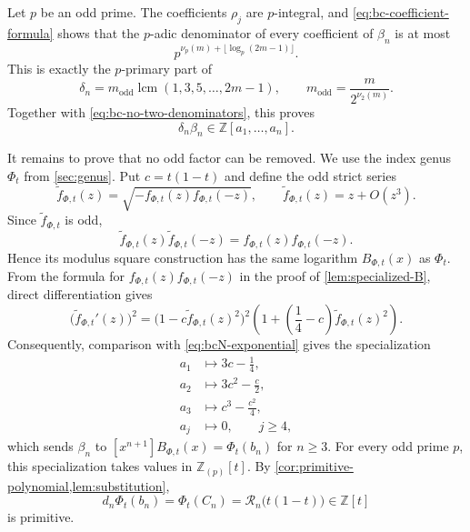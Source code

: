 \documentclass[14pt,dvipsnames]{extarticle}
\makeatletter
\numberwithin{equation}{subsection}
\theoremstyle{plain}
\theoremstyle{definition}
\theoremstyle{definition}
\renewenvironment{proof}[1][\proofname]{
 \par\pushQED{\qed}\normalfont
 \topsep6\p@\@plus6\p@\relax
 \trivlist\item[\hskip\labelsep\bfseries\itshape #1\@addpunct{.}]
}{\popQED\endtrivlist\@endpefalse}
\DeclareMathOperator{\lcm}{lcm}
\makeatother
\begin{document}
\begin{proof}[Proof of \cref{thm:bc-odd-denominator}]
Let $p$ be an odd prime. The coefficients $\rho_j$ are $p$-integral, and
\eqref{eq:bc-coefficient-formula} shows that the $p$-adic denominator of every
coefficient of $\beta_n$ is at most
\[
 p^{\nu_p(m)+\lfloor\log_p(2m-1)\rfloor}.
\]
This is exactly the $p$-primary part of
\[
 \delta_n=m_{\mathrm{odd}}\lcm(1,3,5,\ldots,2m-1),
 \qquad
 m_{\mathrm{odd}}=\frac{m}{2^{\nu_2(m)}}.
\]
Together with \eqref{eq:bc-no-two-denominators}, this proves
\begin{equation}\label{eq:bc-upper-odd}
 \delta_n\beta_n\in\mathbb Z[a_1,\ldots,a_n].
\end{equation}

It remains to prove that no odd factor can be removed. We use the index
genus $\Phi_t$ from \cref{sec:genus}. Put $c=t(1-t)$ and define the odd
strict series
\begin{equation}\label{eq:oddification-Phi}
 \widetilde f_{\Phi,t}(z)
 =\sqrt{-f_{\Phi,t}(z)f_{\Phi,t}(-z)},
 \qquad
 \widetilde f_{\Phi,t}(z)=z+O(z^3).
\end{equation}
Since $\widetilde f_{\Phi,t}$ is odd,
\[
 \widetilde f_{\Phi,t}(z)\widetilde f_{\Phi,t}(-z)
 =f_{\Phi,t}(z)f_{\Phi,t}(-z).
\]
Hence its modulus square construction has the same logarithm
$B_{\Phi,t}(x)$ as $\Phi_t$. From the formula for
$f_{\Phi,t}(z)f_{\Phi,t}(-z)$ in the proof of \cref{lem:specialized-B},
direct differentiation gives
\begin{equation}\label{eq:oddification-equation}
 \bigl(\widetilde f_{\Phi,t}'(z)\bigr)^2
 =\bigl(1-c\widetilde f_{\Phi,t}(z)^2\bigr)^2
  \left(1+\left(\frac14-c\right)\widetilde f_{\Phi,t}(z)^2\right).
\end{equation}
Consequently, comparison with \eqref{eq:bcN-exponential} gives the
specialization
\begin{equation}\label{eq:bc-to-Phi-specialization}
 \begin{aligned}
 a_1&\longmapsto 3c-\frac14,\\
 a_2&\longmapsto 3c^2-\frac c2,\\
 a_3&\longmapsto c^3-\frac{c^2}{4},\\
 a_j&\longmapsto0,\qquad j\geq4,
 \end{aligned}
\end{equation}
which sends $\beta_n$ to $[x^{n+1}]B_{\Phi,t}(x)=\Phi_t(b_n)$ for
$n\geq3$. For every odd prime $p$, this specialization takes values in
$\mathbb Z_{(p)}[t]$. By \cref{cor:primitive-polynomial,lem:substitution},
\[
 d_n\Phi_t(b_n)=\Phi_t(C_n)=\mathcal R_n\bigl(t(1-t)\bigr)\in\mathbb Z[t]
\]
is primitive.


\end{proof}
\end{document}
